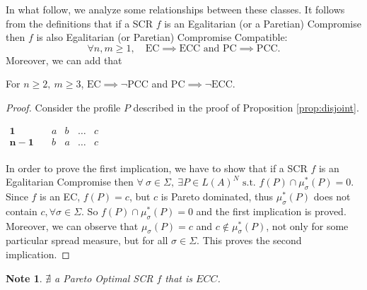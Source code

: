 \documentclass[version=3.21, pagesize, notitlepage, twoside=off, bibliography=totoc, DIV=calc, fontsize=12pt, a4paper]{scrartcl}
\newtheorem*{note}{Note}
\newcommand{\musigma}{\mu_{\sigma}}
\newcommand{\mustar}{\mu_{\sigma}^*}
\begin{document}
\vspace{+1ex}
In what follow, we analyze some relationships between these classes. It follows from the definitions that if a SCR $f$ is an Egalitarian (or a Paretian) Compromise then $f$ is also Egalitarian (or Paretian) Compromise Compatible: 
\[\forall n, m ≥ 1, \quad \text{EC} \implies \text{ECC} \text{ and } \text{PC} \implies \text{PCC}.\]
\vspace{+1ex}
Moreover, we can add that
\begin{proposition} \label{prop:incompatibility} For $n\geq 2, \ m\geq3$, $\text{EC} \implies \lnot \text{PCC}$ and $\text{PC} \implies \lnot \text{ECC}$.
\end{proposition}
\begin{proof}
	Consider the profile $P$ described in the proof of Proposition \ref{prop:disjoint}.
	\begin{center}
		$
		\begin{array}{ccccc}
		\mathbf{1} \quad &a&b&\dots&c\\
		\mathbf{n-1} \quad &b&a&\dots&c\\
		\end{array}
		$
	\end{center}
	In order to prove the first implication, we have to show that if a SCR $f$ is an Egalitarian Compromise then $\forall \ \sigma \in \Sigma , \ \exists P \in L(A)^N  \text{ s.t. }f(P) \cap \mustar(P) = 0$.
	Since $f$ is an EC, $f(P)={c}$, but $c$ is Pareto dominated, thus $\mu_{\sigma}^*(P)$ does not contain ${c}, \forall \sigma \in \Sigma$. So $f(P) \cap \mustar(P) = 0$ and the first implication is proved. Moreover, we can observe that $\musigma(P)={c}$ and $c \notin \mustar(P)$, not only for some particular spread measure, but for all $\sigma \in \Sigma$. This proves the second implication.
\end{proof}
\begin{note}
	$\nexists$ a Pareto Optimal SCR $f$ that is $ECC$.
\end{note}
\end{document}
